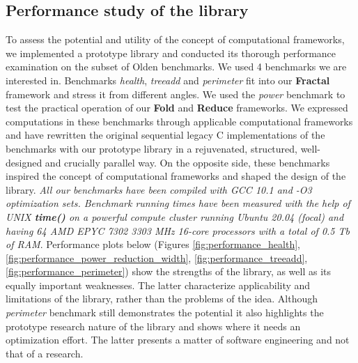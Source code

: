 \subsection{Performance study of the library}
\label{frameworks_runtime}
\quad To assess the potential and utility of the concept of computational frameworks, we implemented a prototype library and conducted its thorough performance examination on the subset of Olden benchmarks. We used 4 benchmarks we are interested in. Benchmarks \textit{health}, \textit{treeadd} and \textit{perimeter} fit into our \textbf{Fractal} framework and stress it from different angles. We used the \textit{power} benchmark to test the practical operation of our \textbf{Fold} and \textbf{Reduce} frameworks. We expressed computations in these benchmarks through applicable computational frameworks and have rewritten the original sequential legacy C implementations of the benchmarks with our prototype library in a rejuvenated, structured, well-designed and crucially parallel way. On the opposite side, these benchmarks inspired the concept of computational frameworks and shaped the design of the library. \textit{All our benchmarks have been compiled with GCC 10.1 and -O3 optimization sets. Benchmark running times have been measured with the help of UNIX \textbf{time()} on a powerful compute cluster running Ubuntu 20.04 (focal) and having 64 AMD EPYC 7302 3303 MHz 16-core processors with a total of 0.5 Tb of RAM}.\newline\null
\quad Performance plots below (Figures \ref{fig:performance_health}, \ref{fig:performance_power_reduction_width}, \ref{fig:performance_treeadd}, \ref{fig:performance_perimeter}) show the strengths of the library, as well as its equally important weaknesses. The latter characterize applicability and limitations of the library, rather than the problems of the idea. Although \textit{perimeter} benchmark still demonstrates the potential it also highlights the prototype research nature of the library and shows where it needs an optimization effort. The latter presents a matter of software engineering and not that of a research.\newline\null
